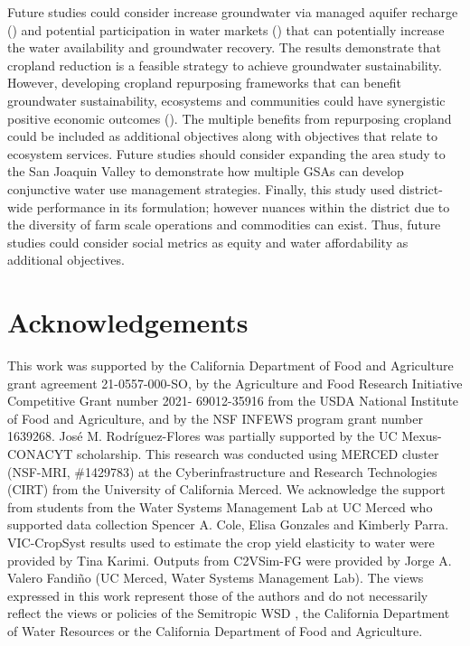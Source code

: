 \documentclass[11pt,a4paper]{article}
\begin{document}
Future studies could consider increase groundwater via managed aquifer recharge (\cite{alam_can_2020}) and potential participation in water markets (\cite{arellano-gonzalez_adaptive_2021,hanak_water_2019}) that can potentially increase the water availability and groundwater recovery. The results demonstrate that cropland reduction is a feasible strategy to achieve groundwater sustainability. However, developing cropland repurposing frameworks that can benefit groundwater sustainability, ecosystems and communities could have synergistic positive economic outcomes (\cite{biggs_landowner_2022,fernandez-bou_water_2023}). The multiple benefits from repurposing cropland could be included as additional objectives along with objectives that relate to ecosystem services. Future studies should consider expanding the area study to the San Joaquin Valley to demonstrate how multiple GSAs can develop conjunctive water use management strategies. Finally, this study used district-wide performance in its formulation; however nuances within the district due to the diversity of farm scale operations and commodities can exist. Thus, future studies could consider social metrics as equity and water affordability as additional objectives.  

\section*{Acknowledgements}

This work was supported by the California Department of Food and Agriculture grant agreement 21-0557-000-SO, by the Agriculture and Food Research Initiative Competitive Grant number 2021- 69012-35916 from the USDA National Institute of Food and Agriculture, and by the NSF INFEWS program grant number 1639268. José M. Rodríguez-Flores was partially supported by the UC Mexus-CONACYT scholarship. This research was conducted using MERCED cluster (NSF-MRI, \#1429783) at the Cyberinfrastructure and Research Technologies (CIRT) from the University of California Merced. We acknowledge the support from students from the Water Systems Management Lab at UC Merced who supported data collection Spencer A. Cole, Elisa Gonzales and Kimberly Parra. VIC-CropSyst results used to estimate the crop yield elasticity to water were provided by Tina Karimi. Outputs from  C2VSim-FG were provided by Jorge A. Valero Fandiño (UC Merced, Water Systems Management Lab). The views expressed in this work represent those of the authors and do not necessarily reflect the views or policies of the Semitropic WSD , the California Department of Water Resources or the California Department of Food and Agriculture. 
\end{document}
